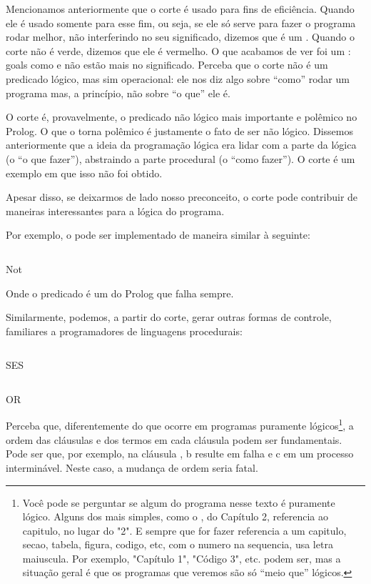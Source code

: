 \documentclass{article}
\begin{document}
Mencionamos anteriormente que o corte é usado para fins de
eficiência. Quando ele é usado somente para esse fim, ou seja, se ele
só serve para fazer o programa rodar melhor, não interferindo no seu
significado, dizemos que é um .  Quando o corte
não é verde, dizemos que ele é vermelho. O que acabamos de ver foi um
: goals como  e
 não estão mais no significado. Perceba que
o corte não é um predicado lógico, mas sim operacional: ele nos diz
algo sobre ``como'' rodar um programa mas, a princípio, não sobre ``o
que'' ele é.

O corte é, provavelmente, o predicado não lógico mais importante e
polêmico no Prolog. O que o torna polêmico é justamente o fato de ser
não lógico. Dissemos anteriormente que a ideia da programação lógica
era lidar com a parte da lógica (o ``o que fazer''), abstraindo a
parte procedural (o ``como fazer''). O corte é um exemplo em que isso
não foi obtido.

Apesar disso, se deixarmos de lado nosso preconceito, o corte pode
contribuir de maneiras interessantes para a lógica do programa.

Por exemplo, o  pode ser implementado de maneira similar
à seguinte:

    \begin{listing}
\inputminted{prolog}{../Exemplos/Cap4/prog3_not.pl}
\caption{Not}
    \end{listing}

Onde o predicado  é um  do Prolog que
falha sempre.

Similarmente, podemos, a partir do corte, gerar outras formas de
controle, familiares a programadores de linguagens procedurais:

    \begin{listing}
\inputminted{prolog}{../Exemplos/Cap4/prog4_ifthenelse.pl}
\caption{SES}
    \end{listing}

    \begin{listing}
\inputminted{prolog}{../Exemplos/Cap4/prog5_or.pl}
\caption{OR}
    \end{listing}

Perceba que, diferentemente do que ocorre em programas puramente
lógicos\footnote{Você pode se perguntar se algum do programa nesse
  texto é puramente lógico. Alguns dos mais simples, como o
  , do Capítulo 2, %
  referencia ao capitulo, no lugar do "2". E sempre que for fazer
  referencia a um capitulo, secao, tabela, figura, codigo, etc, com o
  numero na sequencia, usa letra maiuscula. Por exemplo, "Capítulo 1",
  "Código 3", etc.  podem ser, mas a situação geral é que os programas
  que veremos são só ``meio que'' lógicos.}, a ordem das cláusulas e
dos termos em cada cláusula podem ser fundamentais. Pode ser que, por
exemplo, na cláusula , b resulte em falha e c em
um processo interminável. Neste caso, a mudança de ordem seria fatal.
\end{document}
